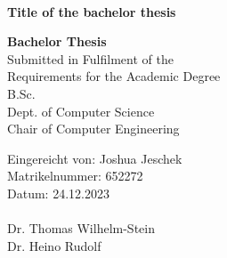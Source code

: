 \documentclass[a4paper, 12pt, oneside, BCOR=1cm,toc=chapterentrywithdots]{scrbook}
\begin{document}
\begin{titlepage}

  \begin{center}
    \\
  \end{center}
  \vspace{0.5cm}

  \begin{center}

    \LARGE{\textbf{Title of the bachelor thesis}}\\
    \vspace{1cm}


    \Large{\textbf{Bachelor Thesis}}\\
    \vspace{1cm}
    Submitted in Fulfilment of the\\
    Requirements for the Academic Degree\\
    B.Sc.\\
    \vspace{0.5cm}
    Dept. of Computer Science\\
    Chair of Computer Engineering
  \end{center}
  \vspace{3cm}
  Eingereicht von: Joshua Jeschek\\
  Matrikelnummer: 652272\\
  Datum: 24.12.2023\\
  \vspace{0.3cm}\\
  Dr. Thomas Wilhelm-Stein \\
  Dr. Heino Rudolf

\end{titlepage}


\end{document}
